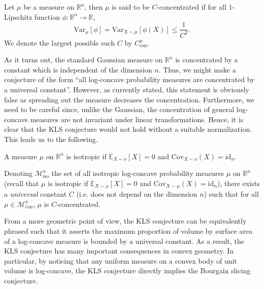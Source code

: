 \begin{definition}
  Let \(\mu\) be a measure on \(\mathbb{R}^n\), then \(\mu\) is said to be \(C\)-concentrated if
  for all \(1\)-Lipschitz function \(\phi : \mathbb{R}^n \to \mathbb{R}\), 
  \begin{equation}
    \text{Var}_\mu[\phi] = \text{Var}_{X \sim \mu}[\phi(X)] \le \frac{1}{C^2}.
  \end{equation}
  We denote the largest possible such \(C\) by \(C^\mu_{\text{con}}\).
\end{definition}

As it turns out, the standard Gaussian measure on \(\mathbb{R}^n\) is concentrated by a constant which 
is independent of the dimension \(n\). Thus, we might make a conjecture of the form 
``all log-concave probability measures are concentrated by a universal constant''. 
However, as currently stated, this statement is obviously false as spreading out 
the measure decreases the concentration. Furthermore, we need to be careful since, unlike the Gaussian, the 
concentration of general log-concave measures are not invariant under linear transformations. Hence, it is clear that the KLS 
conjecture would not hold without a suitable normalization. This leads us to the following.

\begin{definition}[Isotropic]
  A measure \(\mu\) on \(\mathbb{R}^n\) is isotropic if 
  \(\mathbb{E}_{X \sim \nu}[X] = 0\) and \(\text{Cov}_{X \sim \nu}(X) = \text{id}_n\).
\end{definition}

 
\begin{conjecture}\label{conj:KLS}
  Denoting \(\mathscr{M}^n_{\text{iso}}\) the set of all isotropic log-concave probability measures \(\mu\) on 
  \(\mathbb{R}^n\) (recall that \(\mu\) is isotropic if \(\mathbb{E}_{X \sim \mu}[X] = 0\) and \(\text{Cov}_{X \sim \mu}(X) = \text{id}_n\)),
  there exists a \textit{universal} constant \(C\) 
  (i.e. does not depend on the dimension \(n\)) such that for all 
  \(\mu \in \mathscr{M}^n_{\text{con}}\), \(\mu\) is \(C\)-concentrated.
\end{conjecture}

From a more geometric point of view, the KLS conjecture can be equivalently phrased such that it asserts the 
maximum proportion of volume by surface area of a log-concave measure is bounded by a universal constant. 
As a result, the KLS conjecture has many important consequences in convex geometry. 
In particular, by noticing that any uniform measure on a convex body of unit volume is log-concave, 
the KLS conjecture directly implies the Bourgain slicing conjecture.

